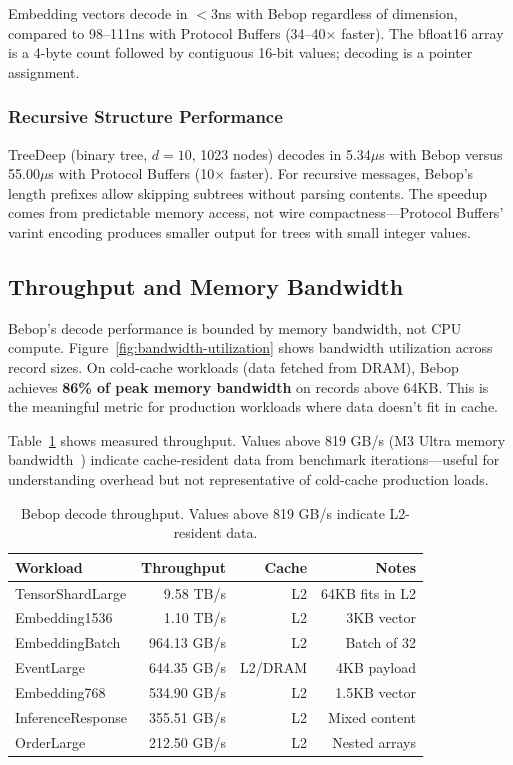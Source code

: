 \documentclass[11pt,onecolumn]{article}
\begin{document}
Embedding vectors decode in $<$3ns with Bebop regardless of dimension, compared to 98--111ns with Protocol Buffers (34--40$\times$ faster). The bfloat16 array is a 4-byte count followed by contiguous 16-bit values; decoding is a pointer assignment.

\subsubsection{Recursive Structure Performance}

TreeDeep (binary tree, $d{=}10$, 1023 nodes) decodes in 5.34$\mu$s with Bebop versus 55.00$\mu$s with Protocol Buffers (10$\times$ faster). For recursive messages, Bebop's length prefixes allow skipping subtrees without parsing contents. The speedup comes from predictable memory access, not wire compactness---Protocol Buffers' varint encoding produces smaller output for trees with small integer values.

\subsection{Throughput and Memory Bandwidth}

Bebop's decode performance is bounded by memory bandwidth, not CPU compute. Figure~\ref{fig:bandwidth-utilization} shows bandwidth utilization across record sizes. On cold-cache workloads (data fetched from DRAM), Bebop achieves \textbf{86\% of peak memory bandwidth} on records above 64KB. This is the meaningful metric for production workloads where data doesn't fit in cache.

Table~\ref{tab:throughput} shows measured throughput. Values above 819 GB/s (M3 Ultra memory bandwidth~\cite{m3-ultra}) indicate cache-resident data from benchmark iterations---useful for understanding overhead but not representative of cold-cache production loads.

\begin{table}[ht]
\centering
\begin{tabular}{@{}lrrr@{}}
\toprule
\textbf{Workload} & \textbf{Throughput} & \textbf{Cache} & \textbf{Notes} \\
\midrule
TensorShardLarge & 9.58 TB/s & L2 & 64KB fits in L2 \\
Embedding1536 & 1.10 TB/s & L2 & 3KB vector \\
EmbeddingBatch & 964.13 GB/s & L2 & Batch of 32 \\
EventLarge & 644.35 GB/s & L2/DRAM & 4KB payload \\
Embedding768 & 534.90 GB/s & L2 & 1.5KB vector \\
InferenceResponse & 355.51 GB/s & L2 & Mixed content \\
OrderLarge & 212.50 GB/s & L2 & Nested arrays \\
\bottomrule
\end{tabular}
\caption{Bebop decode throughput. Values above 819 GB/s indicate L2-resident data.}
\label{tab:throughput}
\end{table}
\end{document}
